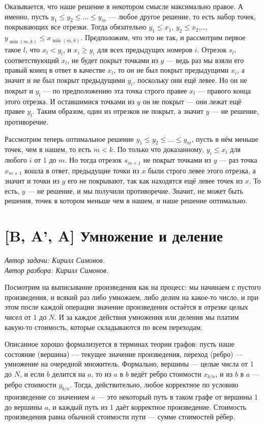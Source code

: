 \documentclass[12pt]{article}
\theoremstyle{definition}
\begin{document}
Оказывается, что наше решение в некотором смысле максимально правое. А именно, пусть $y_1 \le y_2 \le \dots \le y_m$ --- любое другое решение, то есть набор точек, покрывающих все отрезки.
Тогда обязательно $y_1 \le x_1$, $y_2 \le x_2$,\dots, $y_{\min(m, k)} \le x_{\min(m, k)}$. Предположим, что это не так, и рассмотрим первое такое $l$, что $x_l < y_l$, и $x_i\ge y_i$  для всех предыдущих номеров $i$.
Отрезок $s_l$, соответствующий $x_l$, не будет покрыт точками из $y$ --- ведь раз мы взяли его правый конец в ответ в качестве $x_l$, то он не был покрыт предыдущими
$x_i$, а значит и не был покрыт предыдущими $y_i$, поскольку они ещё левее. Но он не покрыт и $y_l$ --- по предположению эта точка строго правее $x_l$ --- правого конца этого отрезка. И
оставшимися точками из $y$ он не покрыт --- они лежат ещё правее $y_l$. Таким образом, один из отрезков не покрыт, а значит $y$ --- не решение, противоречие.

Рассмотрим теперь оптимальное решение $y_1 \le y_2 \le \dots \le y_m$, пусть в нём меньше точек, чем в нашем, то есть $m < k$. По только что доказанному,
$y_i \le x_i$ для любого $i$ от 1 до $m$. Но тогда отрезок $s_{m+1}$ не покрыт точками из $y$ --- раз точка $x_{m+1}$ вошла в ответ, предыдущие точки из $x$ были строго левее этого отрезка,
а значит и точки из $y$ его не покрывают, так как находятся ещё левее точек из $x$. То есть, $y$ --- не решение, и мы получили противоречие. Значит, не может быть решения, точек в котором
меньше чем в нашем, и наше решение оптимально.

\pagebreak

\section{[B, A', A] Умножение и деление}
\textit{Автор задачи: Кирилл Симонов.} \\
\textit{Автор разбора: Кирилл Симонов.}

Посмотрим на выписывание произведения как на процесс: мы начинаем с пустого произведения, и всякий раз либо умножаем, либо делим на какое-то число, и при этом после каждой операции
значение произведения остаётся в отрезке целых чисел от 1 до $N$. И за каждое действия умножения или деления мы платим какую-то стоимость, которые складываются по всем переходам.

Описанное хорошо формализуется в терминах теории графов: пусть наше состояние (вершина) --- текущее значение произведения, переход (ребро) --- умножение на очередной множитель.
Формально, вершины --- целые числа от 1 до $N$, и если $b$ делится на $a$, то из $a$ в $b$ ведёт ребро стоимости $x_{b/a}$, и из $b$ в $a$ --- ребро стоимости $y_{b/a}$.
Тогда, действительно, любое корректное по условию произведение со значением $a$ --- это некоторый путь в таком графе от вершины 1 до вершины $a$, и каждый путь из 1 даёт корректное произведение. Стоимость произведения равна обычной стоимости пути --- сумме стоимостей рёбер.
\end{document}
